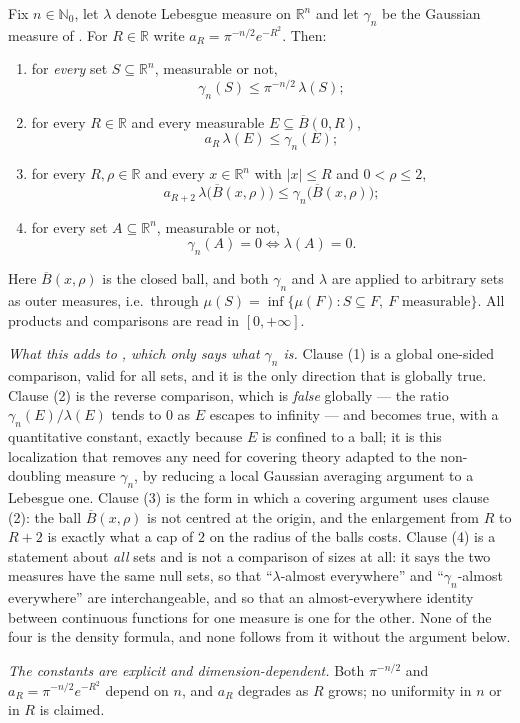 \begin{lemma}
Fix $n \in \mathbb{N}_0$, let $\lambda$ denote Lebesgue measure on
$\mathbb{R}^n$ and let $\gamma_n$ be the Gaussian measure of
.  For $R \in \mathbb{R}$ write
$a_R = \pi^{-n/2}e^{-R^2}$.  Then:
\begin{enumerate}
\item for \emph{every} set $S \subseteq \mathbb{R}^n$, measurable or not,
\[
  \gamma_n(S) \leq \pi^{-n/2}\,\lambda(S) ;
\]
\item for every $R \in \mathbb{R}$ and every measurable
$E \subseteq \overline B(0,R)$,
\[
  a_R\,\lambda(E) \leq \gamma_n(E) ;
\]
\item for every $R, \rho \in \mathbb{R}$ and every $x \in \mathbb{R}^n$ with
$|x| \leq R$ and $0 < \rho \leq 2$,
\[
  a_{R+2}\,\lambda\bigl(\overline B(x,\rho)\bigr)
    \leq \gamma_n\bigl(\overline B(x,\rho)\bigr) ;
\]
\item for every set $A \subseteq \mathbb{R}^n$, measurable or not,
\[
  \gamma_n(A) = 0 \iff \lambda(A) = 0 .
\]
\end{enumerate}
Here $\overline B(x,\rho)$ is the closed ball, and both $\gamma_n$ and $\lambda$
are applied to arbitrary sets as outer measures, i.e.\ through
$\mu(S) = \inf\{\mu(F) : S \subseteq F,\ F \text{ measurable}\}$.  All products
and comparisons are read in $[0,+\infty]$.

\emph{What this adds to , which only says what
$\gamma_n$ is.}  Clause (1) is a global one-sided comparison, valid for all
sets, and it is the only direction that is globally true.  Clause (2) is the
reverse comparison, which is \emph{false} globally --- the ratio
$\gamma_n(E)/\lambda(E)$ tends to $0$ as $E$ escapes to infinity --- and
becomes true, with a quantitative constant, exactly because $E$ is confined to
a ball; it is this localization that removes any need for covering theory
adapted to the non-doubling measure $\gamma_n$, by reducing a local Gaussian
averaging argument to a Lebesgue one.  Clause (3) is the form in which a
covering argument uses clause (2): the ball $\overline B(x,\rho)$ is not
centred at the origin, and the enlargement from $R$ to $R+2$ is exactly what a
cap of $2$ on the radius of the balls costs.  Clause
(4) is a statement about \emph{all} sets and is not a comparison of sizes at
all: it says the two measures have the same null sets, so that
``$\lambda$-almost everywhere'' and ``$\gamma_n$-almost everywhere'' are
interchangeable, and so that an almost-everywhere identity between continuous
functions for one measure is one for the other.  None of the four is the
density formula, and none follows from it without the argument below.

\emph{The constants are explicit and dimension-dependent.}  Both $\pi^{-n/2}$
and $a_R = \pi^{-n/2}e^{-R^2}$ depend on $n$, and $a_R$ degrades as $R$ grows;
no uniformity in $n$ or in $R$ is claimed.
\end{lemma}
